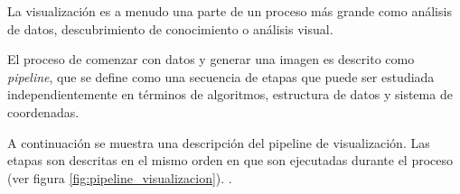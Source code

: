 \documentclass[12pt]{article}
\begin{document}
La visualización es a menudo una parte de un proceso más grande como análisis de datos, descubrimiento de conocimiento o análisis visual.

El proceso de comenzar con datos y generar una imagen es descrito como \textit{pipeline}, que se define como una secuencia de etapas que puede ser estudiada independientemente en términos de algoritmos, estructura de datos y sistema de coordenadas. %

A continuación se muestra una descripción del pipeline de visualización. Las etapas son descritas en el mismo orden en que son ejecutadas durante el proceso (ver figura \ref{fig:pipeline_visualizacion}).
.


\end{document}
